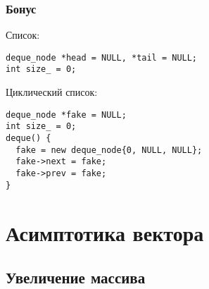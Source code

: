 \documentclass[pdf,russian,aspectratio=169]{beamer}
\begin{document}
\begin{frame}[fragile]
  \frametitle{Бонус}
  Список:
  \begin{verbatim}
deque_node *head = NULL, *tail = NULL;
int size_ = 0;
  \end{verbatim}
  \pause
  \vspace{1em}
  Циклический список:
  \begin{verbatim}
deque_node *fake = NULL;
int size_ = 0;
deque() {
  fake = new deque_node{0, NULL, NULL};
  fake->next = fake;
  fake->prev = fake;
}
  \end{verbatim}
\end{frame}

\section{Асимптотика вектора}
\subsection{Увеличение массива}
\end{document}
